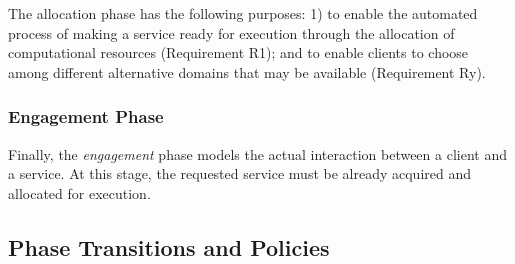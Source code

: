 The allocation phase has the following purposes: 1) to enable the automated process of making a service ready for execution through the allocation of computational resources (Requirement R1); and to enable clients to choose among different alternative domains that may be available (Requirement Ry).
 



\subsubsection*{Engagement Phase}\label{sec:A3-E-engagement}

Finally, the \textit{engagement} phase models the actual interaction between a client and a service. At this stage, the requested service must be already acquired and allocated for execution. 

\subsection{Phase Transitions and Policies}

